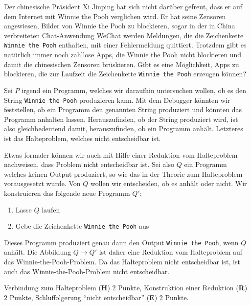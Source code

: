 Der chinesische Präsident Xi Jinping hat sich nicht darüber gefreut, dass
er auf dem Internet mit Winnie the Pooh verglichen wird.
Er hat seine
Zensoren angewiesen, Bilder von Winnie the Pooh zu blockieren, sogar in
der in China verbreiteten Chat-Anwendung WeChat werden Meldungen, die
die Zeichenkette {\tt 
Winnie the Pooh} enthalten, mit einer Fehlermeldung quittiert. 
Trotzdem gibt es natürlich immer noch zahllose Apps, die Winnie the Pooh
nicht blockieren und damit die chinesischen Zensoren brüskieren.
Gibt es eine Möglichkeit, Apps zu blockieren, die zur Laufzeit die
Zeichenkette \texttt{Winnie the Pooh} erzeugen können?


\begin{loesung}
Sei $P$ irgend ein Programm, welches wir daraufhin untersuchen
wollen, ob es den String {\tt Winnie the Pooh} produzieren kann.
Mit dem Debugger könnten wir feststellen, ob ein Programm den
genannten String produziert und könnten das Programm anhalten lassen.
Herauszufinden, ob der String produziert wird, ist also gleichbedeutend
damit, herauszufinden, ob ein Programm anhält.
Letzteres ist das Halteproblem, welches nicht entscheidbar ist.

Etwas formaler können wir auch mit Hilfe einer Reduktion vom Halteproblem
nachweisen, dass Problem nicht entscheidbar ist.
Sei also $Q$ ein Programm welches keinen Output produziert, so wie das
in der Theorie zum Halteproblem vorausgesetzt wurde.
Von $Q$ wollen wir entscheiden, ob es anhält oder nicht.
Wir konstruieren das folgende neue Programm $Q'$:
\begin{enumerate}
\item Lasse $Q$ laufen
\item Gebe die Zeichenkette {\tt Winnie the Pooh} aus
\end{enumerate}
Dieses Programm produziert genau dann den Output {\tt Winnie the Pooh},
wenn $Q$ anhält.
Die Abbildung $Q\to Q'$ ist daher eine Reduktion vom Halteproblem auf
das Winnie-the-Pooh-Problem.
Da das Halteproblem nicht entscheidbar ist, ist auch das
Winnie-the-Pooh-Problem nicht entscheidbar.
\end{loesung}

\begin{bewertung}
Verbindung zum Halteproblem ({\bf H}) 2 Punkte,
Konstruktion einer Reduktion ({\bf R}) 2 Punkte,
Schluffolgerung ``nicht entscheidbar'' ({\bf E}) 2 Punkte.
\end{bewertung}


